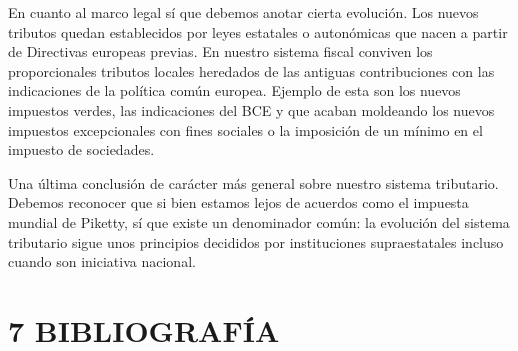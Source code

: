 \documentclass[
]{article}
\begin{document}
En cuanto al marco legal sí que debemos anotar cierta evolución. Los
nuevos tributos quedan establecidos por leyes estatales o autonómicas
que nacen a partir de Directivas europeas previas. En nuestro sistema
fiscal conviven los proporcionales tributos locales heredados de las
antiguas contribuciones con las indicaciones de la política común
europea. Ejemplo de esta son los nuevos impuestos verdes, las
indicaciones del BCE y que acaban moldeando los nuevos impuestos
excepcionales con fines sociales o la imposición de un mínimo en el
impuesto de sociedades.

Una última conclusión de carácter más general sobre nuestro sistema
tributario. Debemos reconocer que si bien estamos lejos de acuerdos como
el impuesta mundial de Piketty, sí que existe un denominador común: la
evolución del sistema tributario sigue unos principios decididos por
instituciones supraestatales incluso cuando son iniciativa nacional.

\hypertarget{bibliografuxeda}{%
\section{7 BIBLIOGRAFÍA}\label{bibliografuxeda}}
\end{document}
